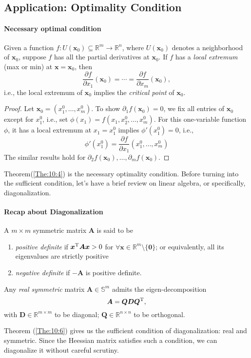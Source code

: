 \subsection{Application: Optimality Condition}
\paragraph{Necessary optimal condition}
\begin{theorem}\label{The:10:4}
Given a function $f:U(\bm x_0) \subseteq\mathbb{R}^m\to\mathbb{R}^n$, where $U(\bm x_0)$ denotes a neighborhood of $\bm x_0$, suppose $f$ has all the partial derivatives at $\bm x_0$. If $f$ has a \emph{local extremum} (max or min) at $\bm x=\bm x_0$, then
\[
\frac{\partial f}{\partial x_1}(\bm x_0)=\cdots=\frac{\partial f}{\partial x_m}(\bm x_0),
\]
i.e., the local extremum of $\bm x_0$ implies the \emph{critical point} of $\bm x_0$.
\end{theorem}
\begin{proof}
Let $\bm x_0=(x_1^0,\dots,x_m^0)$. To show $\partial_1f(\bm x_0)=0$, we fix all entries of $\bm x_0$ except for $x_1^0$, i.e., set $\phi(x_1)=f(x_1,x_2^0,\dots,x_m^0)$. For this one-variable function $\phi$, it has a local extremum at $x_1=x_1^0$ implies $\phi'(x_1^0)=0$, i.e., 
\[
\phi'(x_1^0)=\frac{\partial f}{\partial x_1}(x_1^0,\dots,x_m^0)
\]
The similar results hold for $\partial_2f(\bm x_0),\dots,\partial_mf(\bm x_0)$.
\end{proof}
Theorem(\ref{The:10:4}) is the necessary optimality condition. Before turning into the sufficient condition, let's have a brief review on linear algebra, or specifically, diagonalization.
\paragraph{Recap about Diagonalization}
\begin{definition}
A $m\times m$ symmetric matrix $\bm A$ is said to be
\begin{enumerate}
\item
\emph{positive definite} if $\bm x^{\mathrm T}\bm A\bm x>0$ for $\forall \bm x\in\mathbb{R}^m\setminus\{\bm0\}$; or equivalently, all its eigenvalues are strictly positive
\item
\emph{negative definite} if $-\bm A$ is positive definite.
\end{enumerate}
\end{definition}
\begin{theorem}\label{The:10:6}
Any \emph{real symmetric} matrix $\bm A\in\mathbb{S}^m$ admits the eigen-decomposition
\[
\bm A=\bm Q\bm D\bm Q^{\mathrm T},
\]
with $\bm D\in\mathbb{R}^{m\times m}$ to be diagonal; $\bm Q\in\mathbb{R}^{n\times n}$ to be orthogonal.
\end{theorem}
\begin{remark}
Theorem (\ref{The:10:6}) gives us the sufficient condition of diagonalization: real and symmetric. Since the Heessian matrix satisfies such a condition, we can diagonalize it without careful scrutiny.
\end{remark}


